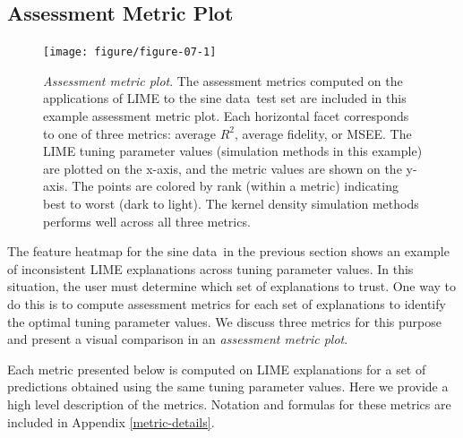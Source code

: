 \documentclass[AMS,STIX2COL]{WileyNJD-v2}\usepackage[]{graphicx}\usepackage[]{color}
\newenvironment{knitrout}{}{} %
\newcommand{\data}{sine data}
\begin{document}
\subsection{Assessment Metric Plot} \label{assess-metric}

\begin{figure}[!thp]
\begin{knitrout}
\color{fgcolor}

{\centering \texttt{[image: figure/figure-07-1]} 

}



\end{knitrout}
\caption{\emph{Assessment metric plot}. The assessment metrics computed on the applications of LIME to the \data \ test set are included in this example assessment metric plot. Each horizontal facet corresponds to one of three metrics: average $R^2$, average fidelity, or MSEE. The LIME tuning parameter values (simulation methods in this example) are plotted on the x-axis, and the metric values are shown on the y-axis. The points are colored by rank (within a metric) indicating best to worst (dark to light). The kernel density simulation methods performs well across all three metrics.}
\label{fig:figure-07}
\end{figure}

The feature heatmap for the \data \ in the previous section shows an example of inconsistent LIME explanations across tuning parameter values. In this situation, the user must determine which set of explanations to trust. One way to do this is to compute assessment metrics for each set of explanations to identify the optimal tuning parameter values. We discuss three metrics for this purpose and present a visual comparison in an \emph{assessment metric plot}.

Each metric presented below is computed on  LIME explanations for a set of predictions obtained using the same tuning parameter values. Here we provide a high level description of the metrics. Notation and formulas for these metrics are included in Appendix \ref{metric-details}.
\end{document}

